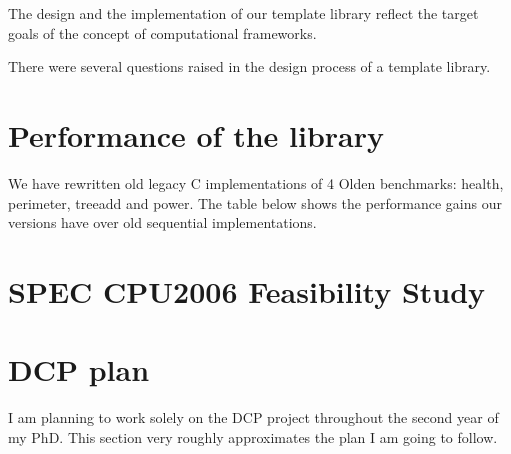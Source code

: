 \documentclass[10pt,a4paper]{report}
\begin{document}
\quad The design and the implementation of our template library reflect the target goals of the concept of computational frameworks.    

\quad There were several questions raised in the design process of a template library. 

\section{Performance of the library}
\quad We have rewritten old legacy C implementations of 4 Olden benchmarks: health, perimeter, treeadd and power. The table below shows the performance gains our versions have over old sequential implementations.

\section{SPEC CPU2006 Feasibility Study}


\section{DCP plan}
\quad I am planning to work solely on the DCP project throughout the second year of my PhD. This section very roughly approximates the plan I am going to follow.
\end{document}
